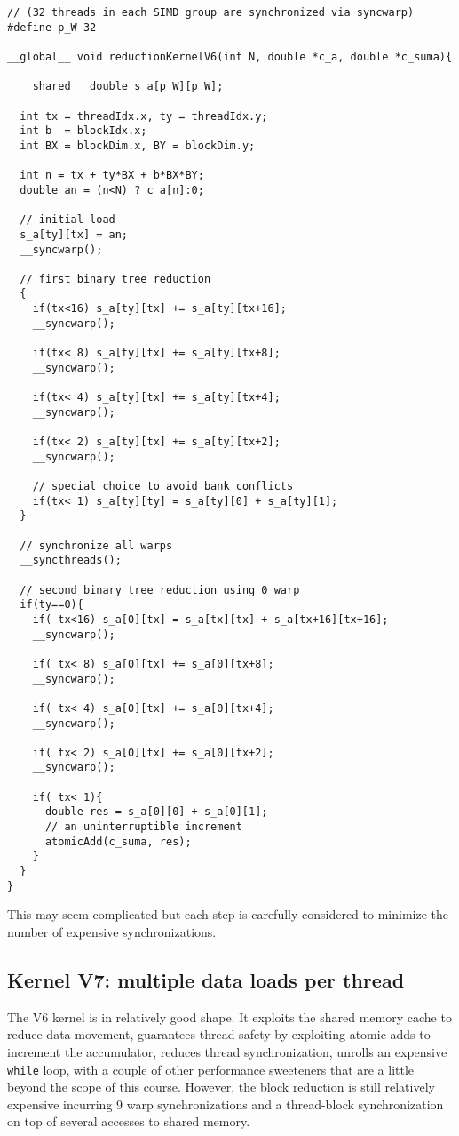 \begin{verbatim}
// (32 threads in each SIMD group are synchronized via syncwarp)                                                                
#define p_W 32

__global__ void reductionKernelV6(int N, double *c_a, double *c_suma){

  __shared__ double s_a[p_W][p_W];

  int tx = threadIdx.x, ty = threadIdx.y;
  int b  = blockIdx.x;
  int BX = blockDim.x, BY = blockDim.y;

  int n = tx + ty*BX + b*BX*BY;
  double an = (n<N) ? c_a[n]:0;

  // initial load
  s_a[ty][tx] = an;
  __syncwarp();

  // first binary tree reduction  
  {
    if(tx<16) s_a[ty][tx] += s_a[ty][tx+16];
    __syncwarp();

    if(tx< 8) s_a[ty][tx] += s_a[ty][tx+8];
    __syncwarp();

    if(tx< 4) s_a[ty][tx] += s_a[ty][tx+4];
    __syncwarp();

    if(tx< 2) s_a[ty][tx] += s_a[ty][tx+2];
    __syncwarp();

    // special choice to avoid bank conflicts
    if(tx< 1) s_a[ty][ty] = s_a[ty][0] + s_a[ty][1];
  }

  // synchronize all warps   
  __syncthreads();

  // second binary tree reduction using 0 warp
  if(ty==0){
    if( tx<16) s_a[0][tx] = s_a[tx][tx] + s_a[tx+16][tx+16];
    __syncwarp();

    if( tx< 8) s_a[0][tx] += s_a[0][tx+8];
    __syncwarp();

    if( tx< 4) s_a[0][tx] += s_a[0][tx+4];
    __syncwarp();

    if( tx< 2) s_a[0][tx] += s_a[0][tx+2];
    __syncwarp();

    if( tx< 1){
      double res = s_a[0][0] + s_a[0][1];
      // an uninterruptible increment   
      atomicAdd(c_suma, res);
    }
  }
}
\end{verbatim}
This may seem complicated but each step is carefully considered to minimize the number of expensive synchronizations.

\subsection{Kernel  V7: multiple data loads per thread}

The V6 kernel is in relatively good shape. It exploits the shared memory cache to reduce data movement, guarantees thread safety by exploiting atomic adds to increment the accumulator, reduces thread synchronization, unrolls an expensive \texttt{while} loop, with a couple of other performance sweeteners that are a little beyond the scope of this course. However, the block reduction is still relatively expensive incurring 9 warp synchronizations and a thread-block synchronization on top of several accesses to shared memory. 


